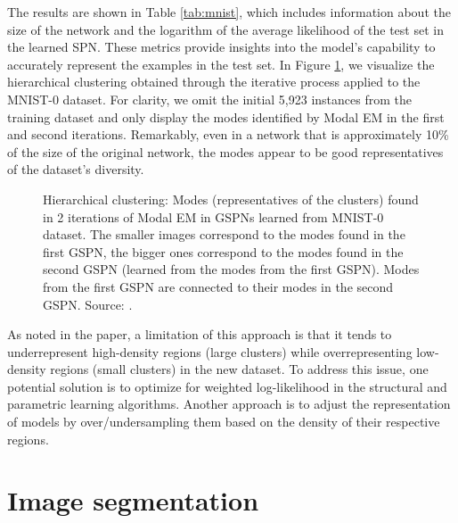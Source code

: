 The results are shown in Table \ref{tab:mnist}, which includes information about the size of the network and the logarithm of the average likelihood of the test set in the learned SPN. These metrics provide insights into the model's capability to accurately represent the examples in the test set. In Figure \ref{fig:mnist}, we visualize the hierarchical clustering obtained through the iterative process applied to the MNIST-0 dataset. For clarity, we omit the initial 5,923 instances from the training dataset and only display the modes identified by Modal EM in the first and second iterations. Remarkably, even in a network that is approximately 10\% of the size of the original network, the modes appear to be good representatives of the dataset's diversity.

\begin{figure}
  \centering
  \caption[Hierarchical clustering of MNIST-0 dataset]{Hierarchical clustering: Modes (representatives of the clusters) found in 2 iterations of Modal EM in GSPNs learned from MNIST-0 dataset. The smaller images correspond to the modes found in the first GSPN, the bigger ones correspond to the modes found in the second GSPN (learned from the modes from the first GSPN). Modes from the first GSPN are connected to their modes in the second GSPN. Source: \citet{Madeira2022}.}
  \label{fig:mnist}
\end{figure}

As noted in the paper, a limitation of this approach is that it tends to underrepresent high-density regions (large clusters) while overrepresenting low-density regions (small clusters) in the new dataset. To address this issue, one potential solution is to optimize for weighted log-likelihood in the structural and parametric learning algorithms. Another approach is to adjust the representation of models by over/undersampling them based on the density of their respective regions.

\section{Image segmentation}
\label{sec:exp:segmentation}

